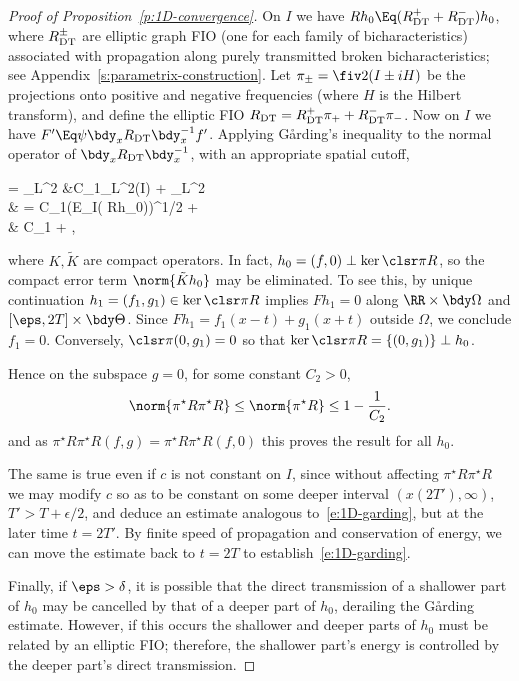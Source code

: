 \documentclass[10pt]{article}
\theoremstyle{plain}
\theoremstyle{definition}
\theoremstyle{remark}
\numberwithin{theorem}{section}
\numberwithin{example}{section}
\numberwithin{equation}{section}
\numberwithin{figure}{section}
\let\d\bdy 						%
\newcommand\En{\mathbf E}		%
\newcommand\DT{\ensuremath{_{\text{\normalfont DT}}}}		%
\newcommand\eqml{\Eq}					%
\newcommand\Garding{G\aa{}rding}
\begin{document}
\begin{proof}[Proof of Proposition~\ref{p:1D-convergence}]
	On $I$ we have $Rh_0 \eqml (R\DT^++R\DT^-) h_0$, where $R\DT^\pm$ are elliptic graph FIO (one for each family of bicharacteristics) associated with propagation along purely transmitted broken bicharacteristics; see Appendix~\ref{s:parametrix-construction}. Let $\pi_\pm=\fiv 2(I\pm iH)$ be the projections onto positive and negative frequencies (where $H$ is the Hilbert transform), and define the elliptic FIO $R\DT=R\DT^+\pi_+ + R\DT^-\pi_-$. Now on $I$ we have $F'\eqml \psi\d_x R\DT \d_x^{-1}f'$. Applying \Garding's inequality to the normal operator of $\d_x R\DT\d_x^{-1}$, with an appropriate spatial cutoff,
	\begin{nalign}
		 = _{L^2} &\leq C_1_{L^2(I)} + _{L^2}\\
				& = C_1\left(\En_{I}( Rh_0)\right)^{1/2} + \\
				& \leq C_1 + ,
		\label{e:1D-garding}
	\end{nalign}
	where $K,\tilde K$ are compact operators. In fact, $h_0=(f,0)\perp\ker \clsr\pi R$, so the compact error term $\norm{\tilde Kh_0}$ may be eliminated. To see this, by unique continuation $h_1=(f_1,g_1)\in\ker\clsr\pi R$ implies $Fh_1=0$ along $\RR\times\bdy\Omega$ and $[\eps,2T]\times\bdy\Theta$. Since $Fh_1=f_1(x-t)+g_1(x+t)$ outside $\Omega$, we conclude $f_1=0$. Conversely, $\clsr\pi(0,g_1)=0$ so that $\ker\clsr\pi R=\{(0,g_1)\}\perp h_0$.
	
	Hence on the subspace $g=0$, for some constant $C_2>0$,
	\begin{equation}
		\norm{\pi^\star R\pi^\star R} \leq \norm{\pi^\star R} \leq 1 - \frac 1{C_2}.
	\end{equation}
	and as $\pi^\star R\pi^\star R(f,g)=\pi^\star R\pi^\star R(f,0)$ this proves the result for all $h_0$.
	
	The same is true even if $c$ is not constant on $I$, since without affecting $\pi^\star R\pi^\star R$ we may modify $c$ so as to be constant on some deeper interval $(x(2T'),\infty)$, $T'>T+\epsilon/2$, and deduce an estimate analogous to~\eqref{e:1D-garding}, but at the later time $t=2T'$. By finite speed of propagation and conservation of energy, we can move the estimate back to $t=2T$ to establish~\eqref{e:1D-garding}.
	
	Finally, if $\eps>\delta$, it is possible that the direct transmission of a shallower part of $h_0$ may be cancelled by that of a deeper part of $h_0$, derailing the \Garding{} estimate. However, if this occurs the shallower and deeper parts of $h_0$ must be related by an elliptic FIO; therefore, the shallower part's energy is controlled by the deeper part's direct transmission.
	

\end{proof}
\end{document}
